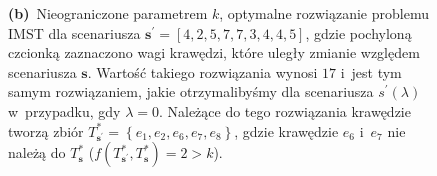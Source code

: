 \begin{figure}[!htbp]
{		\textbf{(b)}~Nieograniczone parametrem $k$, optymalne rozwiązanie problemu \textsc{IMST} dla scenariusza $\textbf{s}^{\prime} = \left[ \textit{4}, 2, \textit{5}, 7, \textit{7}, 3, \textit{4}, 4, 5 \right]$, gdzie pochyloną czcionką zaznaczono wagi krawędzi, które uległy zmianie względem scenariusza $\textbf{s}$.
		Wartość takiego rozwiązania wynosi $17$ i~jest tym samym rozwiązaniem, jakie otrzymalibyśmy dla scenariusza $s^{\prime} \left( \lambda \right)$ w~przypadku, gdy $\lambda = 0$.
		Należące do tego rozwiązania krawędzie tworzą zbiór $T^{\ast}_{\textbf{s}^{\prime}} = \left\{ e_{1}, e_{2}, e_{6}, e_{7}, e_{8} \right\}$, gdzie krawędzie $e_{6}$ i~$e_{7}$ nie należą do $T^{\ast}_{\textbf{s}}$ ($f \left( T^{\ast}_{\textbf{s}^{\prime}}, T^{\ast}_{\textbf{s}} \right) = 2 > k$).
	}
\end{figure}

